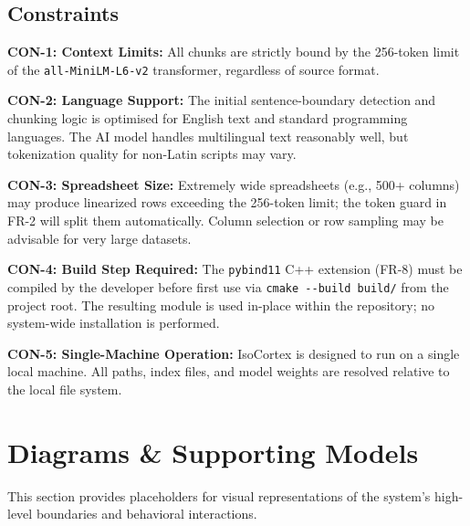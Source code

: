 \documentclass[12pt, a4paper]{article}
\begin{document}
\subsection{Constraints}
\begin{prolist}
    \item \textbf{CON-1: Context Limits:} All chunks are strictly bound by
    the 256-token limit of the \texttt{all-MiniLM-L6-v2} transformer,
    regardless of source format.

    \item \textbf{CON-2: Language Support:} The initial sentence-boundary
    detection and chunking logic is optimised for English text and standard
    programming languages. The AI model handles multilingual text
    reasonably well, but tokenization quality for non-Latin scripts may
    vary.

    \item \textbf{CON-3: Spreadsheet Size:} Extremely wide spreadsheets
    (e.g., 500+ columns) may produce linearized rows exceeding the
    256-token limit; the token guard in FR-2 will split them automatically.
    Column selection or row sampling may be advisable for very large
    datasets.

    \item \textbf{CON-4: Build Step Required:} The \texttt{pybind11} C++
    extension (FR-8) must be compiled by the developer before first use via
    \texttt{cmake -{-}build build/} from the project root. The resulting
    module is used in-place within the repository; no system-wide
    installation is performed.

    \item \textbf{CON-5: Single-Machine Operation:} IsoCortex is designed
    to run on a single local machine. All paths, index files, and model
    weights are resolved relative to the local file system.
\end{prolist}

\newpage
\section{Diagrams \& Supporting Models}

This section provides placeholders for visual representations of the system's high-level boundaries and behavioral interactions.
\end{document}
